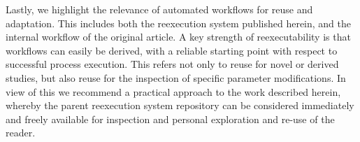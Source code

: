 Lastly, we highlight the relevance of automated workflows for reuse and adaptation.
This includes both the reexecution system published herein, and the internal workflow of the original article.
A key strength of reexecutability is that workflows can easily be derived, with a reliable starting point with respect to successful process execution.
This refers not only to reuse for novel or derived studies, but also reuse for the inspection of specific parameter modifications.
In view of this we recommend a practical approach to the work described herein, whereby the parent reexecution system repository can be considered immediately and freely available for inspection and personal exploration and re-use of the reader.














